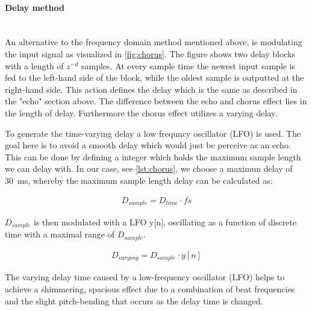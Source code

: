 \paragraph{Delay method}\mbox{}\\
  

An alternative to the frequency domain method mentioned above, is modulating the input signal as visualized in \cref{fig:chorus}. The figure shows two delay blocks with a length of $z^{-d}$ samples. At every sample time the newest input sample is fed to the left-hand side of the block, while the oldest sample is outputted at the right-hand side. This action defines the delay which is the same as described in the "echo" section above. The difference between the echo and chorus effect lies in the length of delay. Furthermore the chorus effect utilizes a varying delay.

To generate the time-varying delay a low frequncy oscillator (LFO) is used. The goal here is to avoid a smooth delay which would just be perceive as an echo. This can be done by defining a integer which holds the maximum sample length we can delay with. In our case, see \cref{lst:chorus}, we choose a maximun delay of \SI{30}{ms}, whereby the maximum sample length delay can be calculated as:

\begin{align}
D_{sample} = D_{time} \cdot fs
\end{align}


 $D_{sample}$ is then modulated with a LFO y[n], oscillating as a function of discrete time with a maximal range of $D_{sample}$.
 
 \begin{align}
 D_{varying} = D_{sample} \cdot y[n]
 \end{align}
 
  The varying delay time caused by a low-frequency oscillator (LFO) helps to achieve a shimmering, spacious effect due to a combination of beat frequencies and the slight pitch-bending that occurs as the delay time is changed.          

